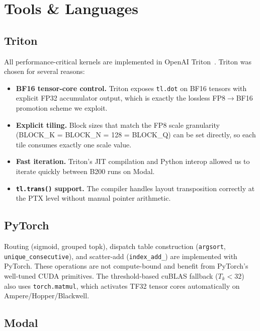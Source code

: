 \section{Tools \& Languages}
\label{sec:tools}

\subsection{Triton}

All performance-critical kernels are implemented in OpenAI Triton~\cite{triton}.
Triton was chosen for several reasons:

\begin{itemize}[leftmargin=1.4em,itemsep=2pt]
  \item \textbf{BF16 tensor-core control.}  Triton exposes \texttt{tl.dot}
        on BF16 tensors with explicit FP32 accumulator output, which is
        exactly the lossless FP8$\to$BF16 promotion scheme we exploit.
  \item \textbf{Explicit tiling.}  Block sizes that match the FP8 scale
        granularity (BLOCK\_K = BLOCK\_N = 128 = BLOCK\_Q) can be set
        directly, so each tile consumes exactly one scale value.
  \item \textbf{Fast iteration.}  Triton's JIT compilation and Python
        interop allowed us to iterate quickly between B200 runs on Modal.
  \item \textbf{\texttt{tl.trans()} support.}  The compiler handles
        layout transposition correctly at the PTX level without manual
        pointer arithmetic.
\end{itemize}

\subsection{PyTorch}

Routing (sigmoid, grouped topk), dispatch table construction
(\texttt{argsort}, \texttt{unique\_consecutive}), and scatter-add
(\texttt{index\_add\_}) are implemented with PyTorch.  These operations
are not compute-bound and benefit from PyTorch's well-tuned CUDA primitives.
The threshold-based cuBLAS fallback ($T_k < 32$) also uses
\texttt{torch.matmul}, which activates TF32 tensor cores automatically on
Ampere/Hopper/Blackwell.

\subsection{Modal}

